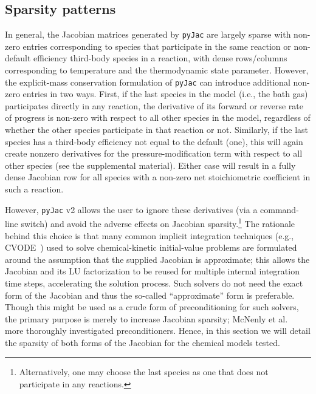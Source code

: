 \documentclass[12pt,number,sort&compress,preprint]{elsarticle}
\begin{document}
\subsection{Sparsity patterns}
\label{S:sparsity}

In general, the Jacobian matrices generated by \texttt{pyJac} are largely sparse with non-zero entries corresponding to species that participate in the same reaction or non-default efficiency third-body species in a reaction, with dense rows\slash columns corresponding to temperature and the thermodynamic state parameter.
However, the explicit-mass conservation formulation of \texttt{pyJac} can introduce additional non-zero entries in two ways.
First, if the last species in the model (i.e., the bath gas) participates directly in any reaction, the derivative of its forward or reverse rate of progress is non-zero with respect to all other species in the model, regardless of whether the other species participate in that reaction or not.
Similarly, if the last species has a third-body efficiency not equal to the default (one), this will again create nonzero derivatives for the pressure-modification term with respect to all other species (see the supplemental material).
Either case will result in a fully dense Jacobian row for all species with a non-zero net stoichiometric coefficient in such a reaction.

However, \texttt{pyJac} v2 allows the user to ignore these derivatives (via a command-line switch) and avoid the adverse effects on Jacobian sparsity.\footnote{Alternatively, one may choose the last species as one that does not participate in any reactions.}
The rationale behind this choice is that many common implicit integration techniques (e.g., CVODE~\cite{Hindmarsh:2005}) used to solve chemical-kinetic initial-value problems are formulated around the assumption that the supplied Jacobian is approximate; this allows the Jacobian and its LU factorization to be reused for multiple internal integration time steps, accelerating the solution process.
Such solvers do not need the exact form of the Jacobian and thus the so-called ``approximate'' form is preferable.
Though this might be used as a crude form of preconditioning for such solvers, the primary purpose is merely to increase Jacobian sparsity; McNenly et al.~\cite{MCNENLY2015581} more thoroughly investigated preconditioners.
Hence, in this section we will detail the sparsity of both forms of the Jacobian for the chemical models tested.
\end{document}
